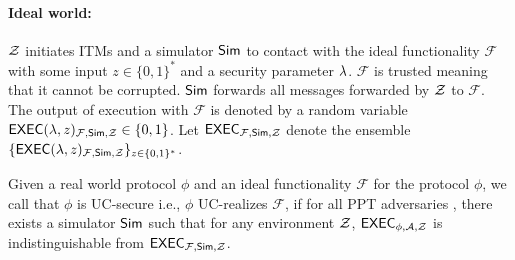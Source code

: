 \paragraph{Ideal world:} $ \mathcal{Z} $ initiates ITMs and a simulator $ \mathsf{Sim} $ to contact with the ideal functionality $ \mathcal{F} $ with some input $ z \in \{0,1\}^* $  and a security parameter $ \lambda $. $ \mathcal{F} $ is trusted meaning that it cannot be corrupted.
$ \mathsf{Sim} $ forwards all messages forwarded by $ \mathcal{Z} $ to $ \mathcal{F} $. The output of execution with $ \mathcal{F} $ is denoted by a random variable $ \mathsf{EXEC}(\lambda, z)_{\mathcal{F},\mathsf{Sim}, \mathcal{Z}} \in \{0,1\}$.  Let $ \mathsf{EXEC}_{\mathcal{F},\mathsf{Sim}, \mathcal{Z}} $ denote the ensemble $ \{\mathsf{EXEC}(\lambda, z)_{\mathcal{F}, \mathsf{Sim}, \mathcal{Z}} \}_{z \in \{0,1\}^*} $.


\begin{definition} \label{def:uc}
	Given a real world protocol $ \phi $ and an ideal functionality $ \mathcal{F} $ for the protocol $ \phi $, we call that $ \phi $ is UC-secure i.e., $ \phi $ UC-realizes $ \mathcal{F} $, if for all PPT adversaries \adv,  there exists a simulator $ \mathsf{Sim}  $ such that for any environment $ \mathcal{Z} $,
	$\mathsf{EXEC}_{\phi, \mathcal{A}, \mathcal{Z}}$ is indistinguishable from $\mathsf{EXEC}_{\mathcal{F},\mathsf{Sim}, \mathcal{Z}}$.
\end{definition}





